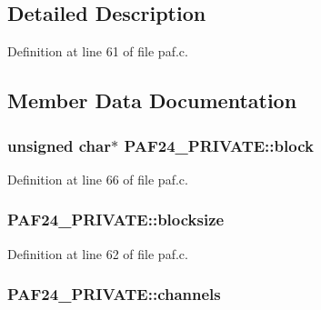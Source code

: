 \subsection{Detailed Description}


Definition at line 61 of file paf.\+c.



\subsection{Member Data Documentation}
\subsubsection[{\texorpdfstring{block}{block}}]{\setlength{\rightskip}{0pt plus 5cm}unsigned char$\ast$ P\+A\+F24\+\_\+\+P\+R\+I\+V\+A\+T\+E\+::block}\hypertarget{struct_p_a_f24___p_r_i_v_a_t_e_a41731d53a005fef3b1b5e361df1c4d8f}{}\label{struct_p_a_f24___p_r_i_v_a_t_e_a41731d53a005fef3b1b5e361df1c4d8f}


Definition at line 66 of file paf.\+c.

\subsubsection[{\texorpdfstring{blocksize}{blocksize}}]{ P\+A\+F24\+\_\+\+P\+R\+I\+V\+A\+T\+E\+::blocksize}\hypertarget{struct_p_a_f24___p_r_i_v_a_t_e_a3f43a8bd1e0a410e045659ebd91367d5}{}\label{struct_p_a_f24___p_r_i_v_a_t_e_a3f43a8bd1e0a410e045659ebd91367d5}


Definition at line 62 of file paf.\+c.

\subsubsection[{\texorpdfstring{channels}{channels}}]{ P\+A\+F24\+\_\+\+P\+R\+I\+V\+A\+T\+E\+::channels}\hypertarget{struct_p_a_f24___p_r_i_v_a_t_e_a3aedd34e64c15fbd52f9bf360a2a969d}{}\label{struct_p_a_f24___p_r_i_v_a_t_e_a3aedd34e64c15fbd52f9bf360a2a969d}


